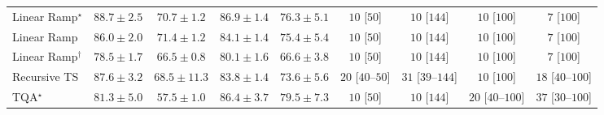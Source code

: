 \begin{tabular}{l|cccc|cccc|}
Linear Ramp$^\star$ & {\cellcolor[HTML]{842E05}} \color[HTML]{F1F1F1} $88.7\pm 2.5$ & {\cellcolor[HTML]{FEAD3A}} \color[HTML]{000000} $70.7\pm 1.2$ & {\cellcolor[HTML]{993404}} \color[HTML]{F1F1F1} $86.9\pm 1.4$ & {\cellcolor[HTML]{F17B1A}} \color[HTML]{F1F1F1} $76.3\pm 5.1$ & {\cellcolor[HTML]{FFF7F3}} \color[HTML]{000000} $10$ [$50$] & {\cellcolor[HTML]{FFF7F3}} \color[HTML]{000000} $10$ [$144$] & {\cellcolor[HTML]{FFF7F3}} \color[HTML]{000000} $10$ [$100$] & {\cellcolor[HTML]{FFF7F3}} \color[HTML]{000000} $7$ [$100$] \\
Linear Ramp & {\cellcolor[HTML]{A33904}} \color[HTML]{F1F1F1} $86.0\pm 2.0$ & {\cellcolor[HTML]{FEA634}} \color[HTML]{000000} $71.4\pm 1.2$ & {\cellcolor[HTML]{B84203}} \color[HTML]{F1F1F1} $84.1\pm 1.4$ & {\cellcolor[HTML]{F4821D}} \color[HTML]{F1F1F1} $75.4\pm 5.4$ & {\cellcolor[HTML]{FFF7F3}} \color[HTML]{000000} $10$ [$50$] & {\cellcolor[HTML]{FFF7F3}} \color[HTML]{000000} $10$ [$144$] & {\cellcolor[HTML]{FFF7F3}} \color[HTML]{000000} $10$ [$100$] & {\cellcolor[HTML]{FFF7F3}} \color[HTML]{000000} $7$ [$100$] \\
Linear Ramp$^\dagger$ & {\cellcolor[HTML]{E56910}} \color[HTML]{F1F1F1} $78.5\pm 1.7$ & {\cellcolor[HTML]{FECF67}} \color[HTML]{000000} $66.5\pm 0.8$ & {\cellcolor[HTML]{DA5C0A}} \color[HTML]{F1F1F1} $80.1\pm 1.6$ & {\cellcolor[HTML]{FECE65}} \color[HTML]{000000} $66.6\pm 3.8$ & {\cellcolor[HTML]{FFF7F3}} \color[HTML]{000000} $10$ [$50$] & {\cellcolor[HTML]{FFF7F3}} \color[HTML]{000000} $10$ [$144$] & {\cellcolor[HTML]{FFF7F3}} \color[HTML]{000000} $10$ [$100$] & {\cellcolor[HTML]{FFF7F3}} \color[HTML]{000000} $7$ [$100$] \\
Recursive TS & {\cellcolor[HTML]{913204}} \color[HTML]{F1F1F1} $87.6\pm 3.2$ & {\cellcolor[HTML]{FEC14C}} \color[HTML]{000000} $68.5\pm 11.3$ & {\cellcolor[HTML]{BB4403}} \color[HTML]{F1F1F1} $83.8\pm 1.4$ & {\cellcolor[HTML]{FB9225}} \color[HTML]{000000} $73.6\pm 5.6$ & {\cellcolor[HTML]{FFF4F0}} \color[HTML]{000000} $20$ [$40$--$50$] & {\cellcolor[HTML]{FFF2EE}} \color[HTML]{000000} $31$ [$39$--$144$] & {\cellcolor[HTML]{FFF7F3}} \color[HTML]{000000} $10$ [$100$] & {\cellcolor[HTML]{FFF5F1}} \color[HTML]{000000} $18$ [$40$--$100$] \\
TQA$^\star$ & {\cellcolor[HTML]{D25306}} \color[HTML]{F1F1F1} $81.3\pm 5.0$ & {\cellcolor[HTML]{FFF9C7}} \color[HTML]{000000} $57.5\pm 1.0$ & {\cellcolor[HTML]{9E3604}} \color[HTML]{F1F1F1} $86.4\pm 3.7$ & {\cellcolor[HTML]{DE610C}} \color[HTML]{F1F1F1} $79.5\pm 7.3$ & {\cellcolor[HTML]{FFF7F3}} \color[HTML]{000000} $10$ [$50$] & {\cellcolor[HTML]{FFF7F3}} \color[HTML]{000000} $10$ [$144$] & {\cellcolor[HTML]{FFF4F0}} \color[HTML]{000000} $20$ [$40$--$100$] & {\cellcolor[HTML]{FEF1ED}} \color[HTML]{000000} $37$ [$30$--$100$] \\

\end{tabular}
